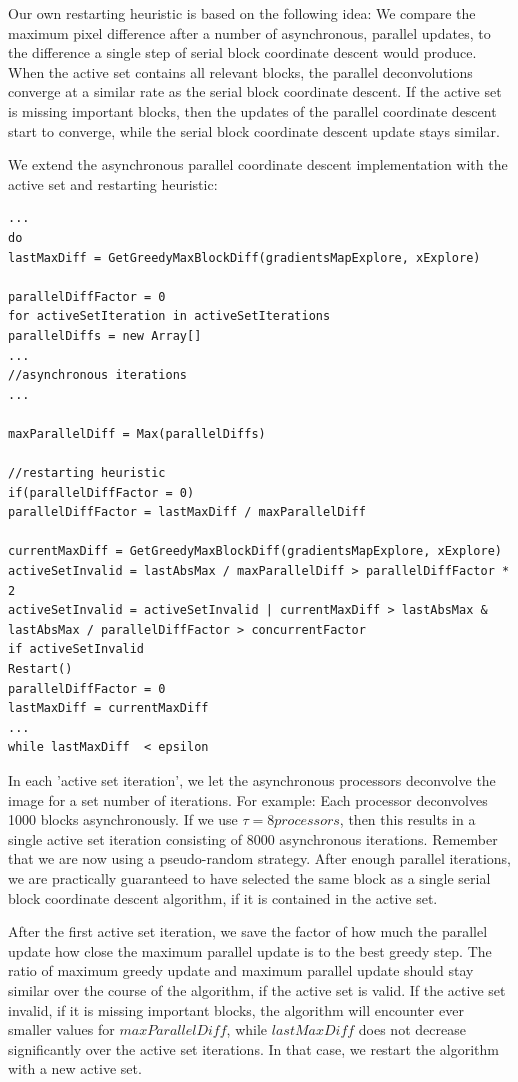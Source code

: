 Our own restarting heuristic is based on the following idea: We compare the maximum pixel difference after a number of asynchronous, parallel updates, to the difference a single step of serial block coordinate descent would produce. When the active set contains all relevant blocks, the parallel deconvolutions converge at a similar rate as the serial block coordinate descent. If the active set is missing important blocks, then the updates of the parallel coordinate descent start to converge, while the serial block coordinate descent update stays similar.

We extend the asynchronous parallel coordinate descent implementation with the active set and restarting heuristic:
\begin{lstlisting}
...
do
lastMaxDiff = GetGreedyMaxBlockDiff(gradientsMapExplore, xExplore)

parallelDiffFactor = 0
for activeSetIteration in activeSetIterations
parallelDiffs = new Array[]
...
//asynchronous iterations
...

maxParallelDiff = Max(parallelDiffs)

//restarting heuristic
if(parallelDiffFactor = 0)
parallelDiffFactor = lastMaxDiff / maxParallelDiff

currentMaxDiff = GetGreedyMaxBlockDiff(gradientsMapExplore, xExplore)
activeSetInvalid = lastAbsMax / maxParallelDiff > parallelDiffFactor * 2
activeSetInvalid = activeSetInvalid | currentMaxDiff > lastAbsMax & lastAbsMax / parallelDiffFactor > concurrentFactor
if activeSetInvalid
Restart()
parallelDiffFactor = 0
lastMaxDiff = currentMaxDiff
...
while lastMaxDiff  < epsilon
\end{lstlisting}

In each 'active set iteration', we let the asynchronous processors deconvolve the image for a set number of iterations. For example: Each processor deconvolves 1000 blocks asynchronously. If we use $\tau = 8 processors$, then this results in a single active set iteration consisting of 8000 asynchronous iterations. Remember that we are now using a pseudo-random strategy. After enough parallel iterations, we are practically guaranteed to have selected the same block as a single serial block coordinate descent algorithm, if it is contained in the active set.

After the first active set iteration, we save the factor of how much the parallel update how close the maximum parallel update is to the best greedy step. The ratio of maximum greedy update and maximum parallel update should stay similar over the course of the algorithm, if the active set is valid. If the active set invalid, if it is missing important blocks, the algorithm will encounter ever smaller values for $maxParallelDiff$, while $lastMaxDiff$ does not decrease significantly over the active set iterations. In that case, we restart the algorithm with a new active set.

